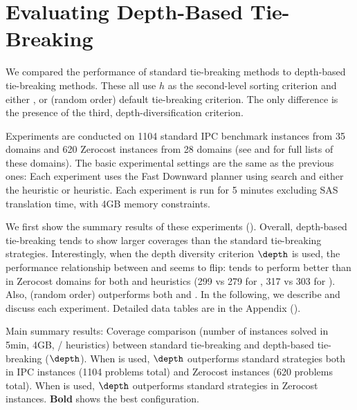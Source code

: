 \section{Evaluating Depth-Based Tie-Breaking}
\label{sec:depth-based-evaluation}



We compared the performance of standard tie-breaking methods to depth-based tie-breaking methods. These all use $h$
as the second-level sorting criterion and either \fifo, \lifo or \ro (random order) default tie-breaking criterion.
The only difference is the presence of the third, depth-diversification criterion.

Experiments are conducted on {1104 standard IPC benchmark
instances} from 35 domains  and {620 Zerocost instances} from 28 domains (see  and  for full lists of these domains). 
The basic experimental settings are the same as the previous ones:
Each experiment uses the Fast Downward planner using \astar search and either the \lmcut heuristic or \mands heuristic.
Each experiment is run for 5 minutes excluding SAS translation time, with 4GB memory constraints.

We first show the summary results of these experiments ().
Overall, depth-based tie-breaking tends to show larger coverages than the
standard tie-breaking strategies.
Interestingly, when the depth diversity criterion $\depth$ is used, 
the performance relationship between \lifo and \fifo seems to flip:
\fifo tends to perform better than \lifo in Zerocost domains for both
\lmcut and \mands heuristics (299 vs 279 for \lmcut, 317 vs 303 for \mands).
Also, \ro (random order) outperforms both \fifo and \lifo.
In the following, we describe and discuss each experiment.
Detailed data tables are in the Appendix ().

\begin{table}[htb]
 {
 \centering
 \setlength{\tabcolsep}{3pt}
 
 \caption{
 Main summary results: Coverage comparison (number of instances solved in 5min, 4GB, \lmcut/\mands
 heuristics) between standard tie-breaking and depth-based tie-breaking
 ($\depth$). When \lmcut is used, $\depth$ outperforms standard strategies both in IPC
 instances (1104 problems total) and Zerocost instances (620 problems
 total). When \mands is used, $\depth$ outperforms standard strategies
 in Zerocost instances. \textbf{Bold} shows the best configuration.}
 \label{tbl:depth-summary}
 }
\end{table}

